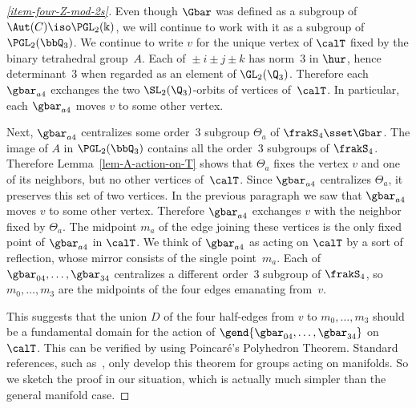 \begin{proofc}
\begin{proof}[\eqref{item-four-Z-mod-2s}]
Even though $\Gbar$ was defined as a subgroup of $\Aut(C)\iso\PGL_2(\Bbbk)$, we will continue to work with it as a subgroup of $\PGL_2(\bbQ_3)$. We continue to write $v$ for the unique vertex of $\calT$ fixed by the binary tetrahedral group~$A$. Each of ${ }\pm i\pm j\pm k$ has norm~$3$ in $\hur$, hence determinant~$3$ when regarded as an element of $\GL_2(\Q_3)$. Therefore each $\gbar_{a4}$ exchanges the two $\SL_2(\Q_3)$-orbits of vertices of~$\calT$. In particular, each $\gbar_{a4}$ moves $v$ to some other vertex.

Next, $\gbar_{a4}$ centralizes some order~$3$ subgroup $\Theta_a$ of $\frakS_4\sset\Gbar$. The image of $A$ in $\PGL_2(\bbQ_3)$ contains all the order~$3$ subgroups of $\frakS_4$. Therefore Lemma~\ref{lem-A-action-on-T} shows that $\Theta_a$ fixes the vertex $v$ and one of its neighbors, but no other vertices of~$\calT$. Since $\gbar_{a4}$ centralizes $\Theta_a$, it preserves this set of two vertices. In the previous paragraph we saw that $\gbar_{a4}$ moves $v$ to some other vertex. Therefore $\gbar_{a4}$ exchanges $v$ with the neighbor fixed by $\Theta_a$. The midpoint $m_a$ of the edge joining these vertices is the only fixed point of $\gbar_{a4}$ in $\calT$. We think of $\gbar_{a4}$ as acting on $\calT$ by a sort of reflection, whose mirror consists of the single point~$m_a$. Each of $\gbar_{04},\dots,\gbar_{34}$ centralizes a different order~$3$ subgroup of $\frakS_4$, so $m_0,\dots,m_3$ are the midpoints of the four edges emanating from~$v$.

This suggests that the union $D$ of the four half-edges from $v$ to $m_0,\dots,m_3$ should be a fundamental domain for the action of $\gend{\gbar_{04},\dots,\gbar_{34}}$ on~$\calT$. This can be verified by using Poincaré's Polyhedron Theorem. Standard references, such as~\cite[Section~IV.H]{Maskit}, only develop this theorem for groups acting on manifolds. So we sketch the proof in our situation, which is actually much simpler than the general manifold case.


\end{proof}
\end{proofc}
